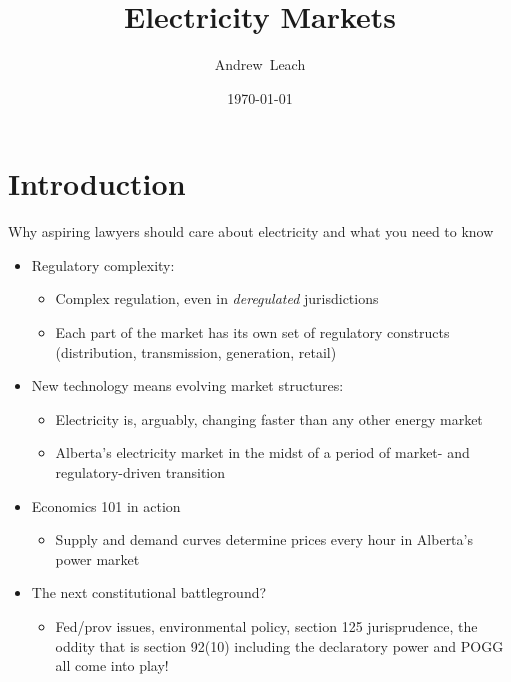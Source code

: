 \documentclass{beamer}
\title[Electricity Slide Pack]
{%
  Electricity Markets%
}
\author[Leach]
{
  Andrew~Leach
}
\institute[2017]
{
  University of Alberta
 }
\date[5/28/2017]
{\today}
\renewcommand{\(}{\begin{columns}}
\renewcommand{\)}{\end{columns}}
\newcommand{\<}[1]{\begin{column}{#1}}
\renewcommand{\>}{\end{column}}
\begin{document}
\begin{frame}
   \titlepage
   \vfill
\end{frame}



\section{Introduction}




\begin{frame}{Why aspiring lawyers should care about electricity and what you need to know}
\begin{itemize}
\setlength\itemsep{.5em}
\item Regulatory complexity:
\begin{itemize}
\setlength\itemsep{.5em}
    \item Complex regulation, even in \textit{deregulated} jurisdictions
    \item Each part of the market has its own set of regulatory constructs (distribution, transmission, generation, retail)
\end{itemize}
\item New technology means evolving market structures:
\begin{itemize}
\setlength\itemsep{.5em}
\item Electricity is, arguably, changing faster than any other energy market
\item Alberta's electricity market in the midst of a period of market- and regulatory-driven transition
\end{itemize}
\item Economics 101 in action
\begin{itemize}
\setlength\itemsep{.5em}
\item Supply and demand curves determine prices every hour in Alberta's power market
\end{itemize}
\item The next constitutional battleground?
\begin{itemize}
\setlength\itemsep{.5em}
\item Fed/prov issues, environmental policy, section 125 jurisprudence, the oddity that is section 92(10) including the declaratory power and POGG all come into play!
\end{itemize}
\end{itemize}
\vfill
\end{frame}
\end{document}
